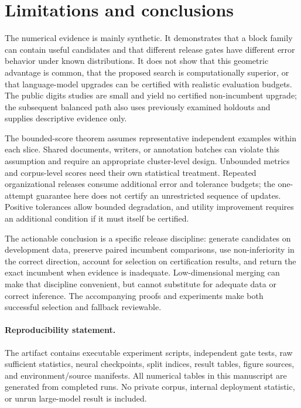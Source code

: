 \documentclass[11pt,letterpaper]{article}
\begin{document}
\section{Limitations and conclusions}
The numerical evidence is mainly synthetic. It demonstrates that a block family can contain useful candidates and that different release gates have different error behavior under known distributions. It does not show that this geometric advantage is common, that the proposed search is computationally superior, or that language-model upgrades can be certified with realistic evaluation budgets. The public digits studies are small and yield no certified non-incumbent upgrade; the subsequent balanced path also uses previously examined holdouts and supplies descriptive evidence only.

The bounded-score theorem assumes representative independent examples within each slice. Shared documents, writers, or annotation batches can violate this assumption and require an appropriate cluster-level design. Unbounded metrics and corpus-level scores need their own statistical treatment. Repeated organizational releases consume additional error and tolerance budgets; the one-attempt guarantee here does not certify an unrestricted sequence of updates. Positive tolerances allow bounded degradation, and utility improvement requires an additional condition if it must itself be certified.

The actionable conclusion is a specific release discipline: generate candidates on development data, preserve paired incumbent comparisons, use non-inferiority in the correct direction, account for selection on certification results, and return the exact incumbent when evidence is inadequate. Low-dimensional merging can make that discipline convenient, but cannot substitute for adequate data or correct inference. The accompanying proofs and experiments make both successful selection and fallback reviewable.

\paragraph{Reproducibility statement.}
The artifact contains executable experiment scripts, independent gate tests, raw sufficient statistics, neural checkpoints, split indices, result tables, figure sources, and environment/source manifests. All numerical tables in this manuscript are generated from completed runs. No private corpus, internal deployment statistic, or unrun large-model result is included.
\end{document}

